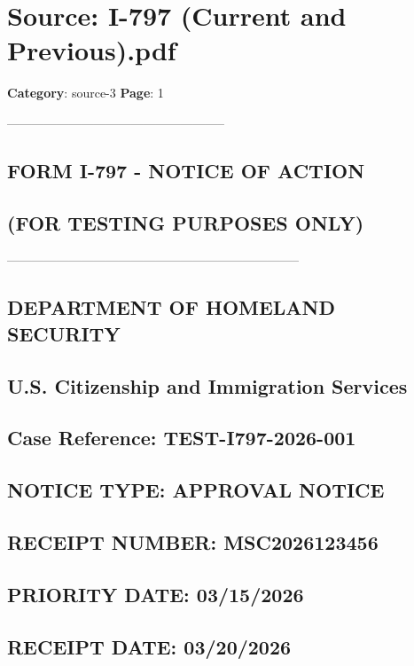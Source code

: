 \section*{Source: I-797 (Current and Previous).pdf}
\textbf{Category}: source-3
\textbf{Page}: 1

-----------------------------------------------------

\subsection*{FORM I-797 - NOTICE OF ACTION}

\subsection*{(FOR TESTING PURPOSES ONLY)}

-----------------------------------------------------------------------

\subsection*{DEPARTMENT OF HOMELAND SECURITY}

\subsection*{U.S. Citizenship and Immigration Services}

\subsection*{Case Reference: TEST-I797-2026-001}

\subsection*{NOTICE TYPE: APPROVAL NOTICE}

\subsection*{RECEIPT NUMBER: MSC2026123456}

\subsection*{PRIORITY DATE: 03/15/2026}

\subsection*{RECEIPT DATE: 03/20/2026}

